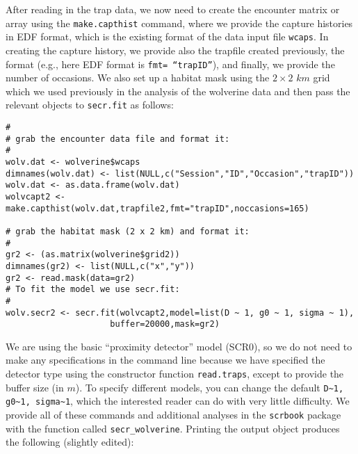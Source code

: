 After reading in the trap data, we now need to create the encounter matrix
or array using the
\mbox{\tt make.capthist} command, where we provide the capture
histories in EDF format, which is the existing format of
the data input file \mbox{\tt wcaps}.
In creating the capture history, we provide also the trapfile created
previously, the format (e.g., here EDF format is \mbox{\tt fmt=
  ``trapID''}), 
and finally, we provide the number of occasions. We also set up a
habitat mask using the $2 \times 2$ $km$ grid which we used previously
in the analysis of the wolverine data and then pass the relevant
objects to \mbox{\tt secr.fit} as follows:
{\small 
\begin{verbatim}
#
# grab the encounter data file and format it:
#
wolv.dat <- wolverine$wcaps 
dimnames(wolv.dat) <- list(NULL,c("Session","ID","Occasion","trapID"))
wolv.dat <- as.data.frame(wolv.dat)
wolvcapt2 <- make.capthist(wolv.dat,trapfile2,fmt="trapID",noccasions=165)

# grab the habitat mask (2 x 2 km) and format it:
#
gr2 <- (as.matrix(wolverine$grid2))
dimnames(gr2) <- list(NULL,c("x","y"))
gr2 <- read.mask(data=gr2)
# To fit the model we use secr.fit:
#
wolv.secr2 <- secr.fit(wolvcapt2,model=list(D ~ 1, g0 ~ 1, sigma ~ 1), 
                     buffer=20000,mask=gr2)
\end{verbatim}
}
We are using the 
basic ``proximity detector'' model (SCR0), so we do not need to make any specifications in
the command line because we have specified the detector type using the
constructor function \mbox{\tt read.traps},
except to provide the buffer size (in $m$).  To
specify different models, you can change the default
\verb#D~1, g0~1, sigma~1#, which the interested reader can do with
very little difficulty. We provide all of these commands and
additional analyses in the \mbox{\tt scrbook} package with the
function called \mbox{\tt secr\_wolverine}. Printing the output object
produces the following (slightly edited):

